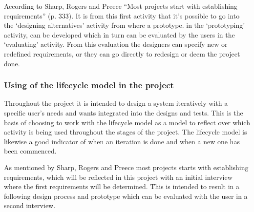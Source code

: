 According to Sharp, Rogers and Preece “Most projects start with establishing requirements” (p. 333). It is from this first activity that it’s possible to go into the ‘designing alternatives’ activity from where a prototype. in the ‘prototyping’ activity, can be developed which in turn can be evaluated by the users in the ‘evaluating’ activity. From this evaluation the designers can specify new or redefined requirements, or they can go directly to redesign or deem the project done.
\subsubsection{Using of the lifecycle model in the project}
Throughout the project it is intended to design a system iteratively with a specific user’s needs and wants integrated into the designs and tests. This is the basis of choosing to work with the lifecycle model as a model to reflect over which activity is being used throughout the stages of the project. The lifecycle model is likewise a good indicator of when an iteration is done and when a new one has been commenced.

As mentioned by Sharp, Rogers and Preece most projects starts with establishing requirements, which will be reflected in this project with an initial interview where the first requirements will be determined. This is intended to result in a following design process and prototype which can be evaluated with the user in a second interview.

